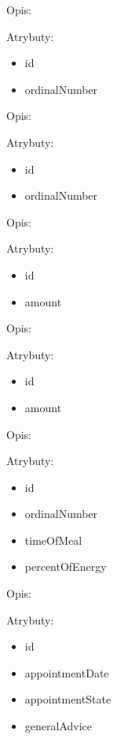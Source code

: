 \begin{enumerate}[label={\textbf{KAT/\protect\threedigits{\theenumi}}}, wide, labelwidth=!, labelindent=0pt, series=reqs]
     \label{kat:MealPlanDay}

    Opis: \lipsum[1]
    \par
    Atrybuty:
    \begin{itemize}
        \item id
        \item ordinalNumber
    \end{itemize}

     \label{kat:Meal}

    Opis: \lipsum[1]
    \par
    Atrybuty:
    \begin{itemize}
        \item id
        \item ordinalNumber
    \end{itemize}

     \label{kat:MealRecipe}

    Opis: \lipsum[1]
    \par
    Atrybuty:
    \begin{itemize}
        \item id
        \item amount
    \end{itemize}

     \label{kat:MealProduct}

    Opis: \lipsum[1]
    \par
    Atrybuty:
    \begin{itemize}
        \item id
        \item amount
    \end{itemize}

     \label{kat:MealDefinition}

    Opis: \lipsum[1]
    \par
    Atrybuty:
    \begin{itemize}
        \item id
        \item ordinalNumber
        \item timeOfMeal
        \item percentOfEnergy
    \end{itemize}

     \label{kat:Appointment}

    Opis: \lipsum[1]
    \par
    Atrybuty:
    \begin{itemize}
        \item id
        \item appointmentDate
        \item appointmentState
        \item generalAdvice
    \end{itemize}


\end{enumerate}
